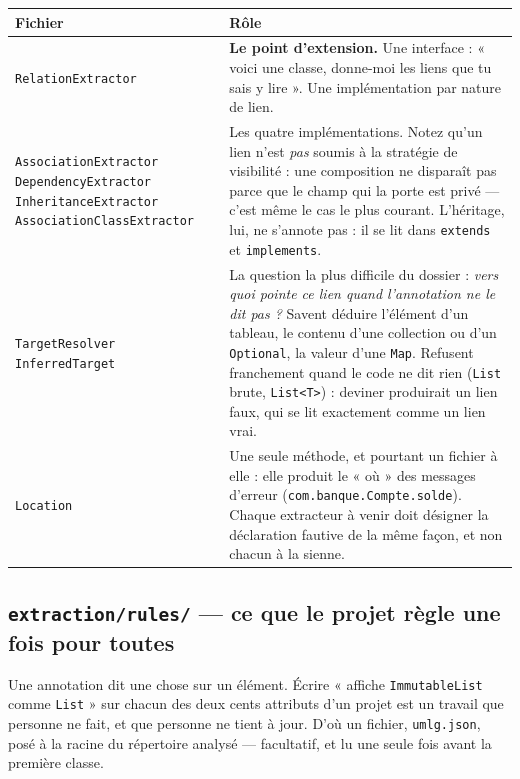 \documentclass[12pt, a4paper]{article}
\begin{document}
\begin{longtable}{L{4.2cm} L{10cm}}
\toprule
\textbf{Fichier} & \textbf{Rôle} \\
\midrule
\endhead
\texttt{RelationExtractor} &
\textbf{Le point d'extension.} Une interface : « voici une classe, donne-moi les liens que tu
sais y lire ». Une implémentation par nature de lien. \\
\addlinespace
\texttt{AssociationExtractor} \newline \texttt{DependencyExtractor} \newline
\texttt{InheritanceExtractor} \newline \texttt{AssociationClassExtractor} &
Les quatre implémentations. Notez qu'un lien n'est \emph{pas} soumis à la stratégie de
visibilité : une composition ne disparaît pas parce que le champ qui la porte est privé — c'est
même le cas le plus courant. L'héritage, lui, ne s'annote pas : il se lit dans \texttt{extends}
et \texttt{implements}. \\
\addlinespace
\texttt{TargetResolver} \newline \texttt{InferredTarget} &
La question la plus difficile du dossier : \emph{vers quoi pointe ce lien quand l'annotation ne
le dit pas ?} Savent déduire l'élément d'un tableau, le contenu d'une collection ou d'un
\texttt{Optional}, la valeur d'une \texttt{Map}. Refusent franchement quand le code ne dit rien
(\texttt{List} brute, \texttt{List<T>}) : deviner produirait un lien faux, qui se lit exactement
comme un lien vrai. \\
\addlinespace
\texttt{Location} &
Une seule méthode, et pourtant un fichier à elle : elle produit le « où » des messages d'erreur
(\texttt{com.banque.Compte.solde}). Chaque extracteur à venir doit désigner la déclaration
fautive de la même façon, et non chacun à la sienne. \\
\bottomrule
\end{longtable}

\subsection{\texttt{extraction/rules/} — ce que le projet règle une fois pour toutes}

Une annotation dit une chose sur un élément. Écrire « affiche \texttt{ImmutableList} comme
\texttt{List} » sur chacun des deux cents attributs d'un projet est un travail que personne ne
fait, et que personne ne tient à jour. D'où un fichier, \texttt{umlg.json}, posé à la racine du
répertoire analysé — facultatif, et lu une seule fois avant la première classe.
\end{document}
